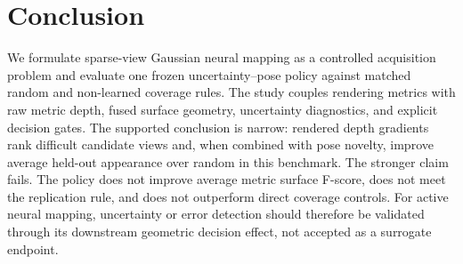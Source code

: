 \section{Conclusion}

We formulate sparse-view Gaussian neural mapping as a controlled acquisition
problem and evaluate one frozen uncertainty--pose policy against matched random
and non-learned coverage rules.  The study couples rendering metrics with raw
metric depth, fused surface geometry, uncertainty diagnostics, and explicit
decision gates.  The supported conclusion is narrow: rendered depth gradients
rank difficult candidate views and, when combined with pose novelty, improve
average held-out appearance over random in this benchmark.  The stronger claim
fails.  The policy does not improve average metric surface F-score, does not
meet the replication rule, and does not outperform direct coverage controls.
For active neural mapping, uncertainty or error detection should therefore be
validated through its downstream geometric decision effect, not accepted as a
surrogate endpoint.
